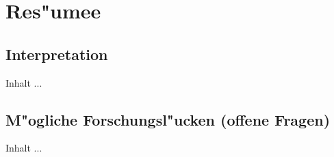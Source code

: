
\chapter{Res"umee}
\minitoc 
\vspace{1 cm} 

\section{Interpretation}
Inhalt ...


\section{M"ogliche Forschungsl"ucken (offene Fragen)}
Inhalt ...



